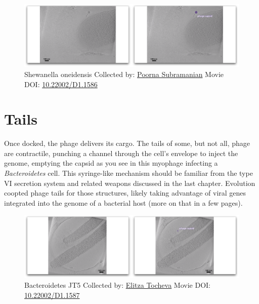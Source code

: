 \documentclass[]{tufte-book}
\begin{document}
\begin{figure}
\includegraphics{movie_stills/10_1} \caption[Shewanella oneidensis Collected by:
\protect\hyperlink{poorna_subramanian}{Poorna Subramanian} Movie DOI:
\href{https://doi.org/10.22002/D1.1586}{10.22002/D1.1586}]{Shewanella oneidensis Collected by:
\protect\hyperlink{poorna_subramanian}{Poorna Subramanian} Movie DOI:
\href{https://doi.org/10.22002/D1.1586}{10.22002/D1.1586}}\label{fig:10-1}
\end{figure}

\section{Tails}\label{tails}

Once docked, the phage delivers its cargo. The tails of some, but not
all, phage are contractile, punching a channel through the cell's
envelope to inject the genome, emptying the capsid as you see in this
myophage infecting a \emph{Bacteroidetes} cell. This syringe-like
mechanism should be familiar from the type VI secretion system and
related weapons discussed in the last chapter. Evolution coopted phage
tails for those structures, likely taking advantage of viral genes
integrated into the genome of a bacterial host (more on that in a few
pages).





\begin{figure}
\includegraphics{movie_stills/10_2} \caption[Bacteroidetes JT5 Collected by:
\protect\hyperlink{elitza_tocheva}{Elitza Tocheva} Movie DOI:
\href{https://doi.org/10.22002/D1.1587}{10.22002/D1.1587}]{Bacteroidetes JT5 Collected by:
\protect\hyperlink{elitza_tocheva}{Elitza Tocheva} Movie DOI:
\href{https://doi.org/10.22002/D1.1587}{10.22002/D1.1587}}\label{fig:10-2}
\end{figure}
\end{document}
